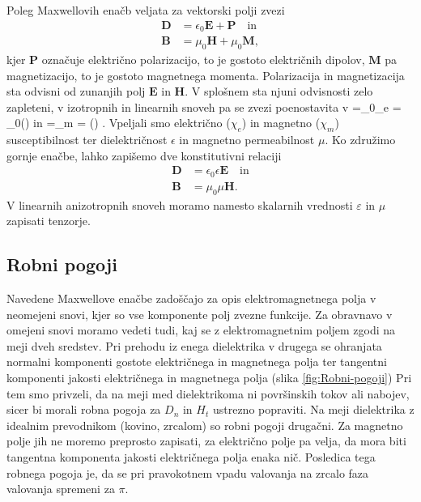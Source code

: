 Poleg Maxwellovih enačb veljata za vektorski polji zvezi
\begin{align}
\mathbf{D} & =\epsilon_{0}\mathbf{E}+\mathbf{P} \quad \mathrm{in}\\
\mathbf{B} & =\mu_{0}\mathbf{H}+\mu_{0}\mathbf{M},
\end{align}
kjer $\mathbf{P}$ označuje električno
polarizacijo, to je gostoto električnih dipolov, $\mathbf{M}$
pa magnetizacijo, to je gostoto magnetnega momenta.
Polarizacija in magnetizacija sta odvisni od zunanjih polj $\mathbf{E}$
in $\mathbf{H}$. V splošnem sta njuni odvisnosti zelo zapleteni,
v izotropnih in linearnih snoveh pa se zvezi poenostavita v 
\beq
{}=\epsilon_{0}\chi_e = \epsilon_{0}() \qquad \textrm{in} 
\qquad
{}=\chi_m  = ()
\label{eq:PM}.
\eeq
Vpeljali smo  električno ($\chi_e$) in 
magnetno ($\chi_m$) susceptibilnost ter
dielektričnost $\epsilon$ in
magnetno permeabilnost $\mu$. Ko združimo gornje
enačbe, lahko zapišemo dve konstitutivni
relaciji
\begin{align}
\mathbf{D} & =\epsilon_{0}\epsilon\mathbf{E}\quad \mathrm{in}\\
\mathbf{B} & =\mu_{0}\mu\mathbf{H}.
\end{align}
V linearnih anizotropnih snoveh moramo namesto skalarnih vrednosti $\varepsilon$
in $\mu$ zapisati tenzorje. 

\subsection*{Robni pogoji}
Navedene Maxwellove enačbe zadoščajo za opis elektromagnetnega polja
v neomejeni snovi, kjer so vse komponente polj zvezne funkcije. Za
obravnavo v omejeni snovi moramo vedeti tudi, kaj se z elektromagnetnim
poljem zgodi na meji dveh sredstev. Pri prehodu
iz enega dielektrika v drugega se ohranjata normalni komponenti gostote
električnega in magnetnega polja ter tangentni komponenti jakosti
električnega in magnetnega polja (slika \ref{fig:Robni-pogoji}) 
Pri tem smo privzeli, da na meji med dielektrikoma ni površinskih
tokov ali nabojev, sicer bi morali robna pogoja za $D_n$ in $H_t$
ustrezno popraviti. Na meji dielektrika z idealnim prevodnikom (kovino,
zrcalom) so robni pogoji drugačni. Za magnetno polje jih ne moremo
preprosto zapisati, za električno polje pa velja, da mora biti tangentna
komponenta jakosti električnega polja enaka nič. Posledica tega robnega
pogoja je, da se pri pravokotnem vpadu valovanja na zrcalo faza valovanja
spremeni za $\pi$. 

